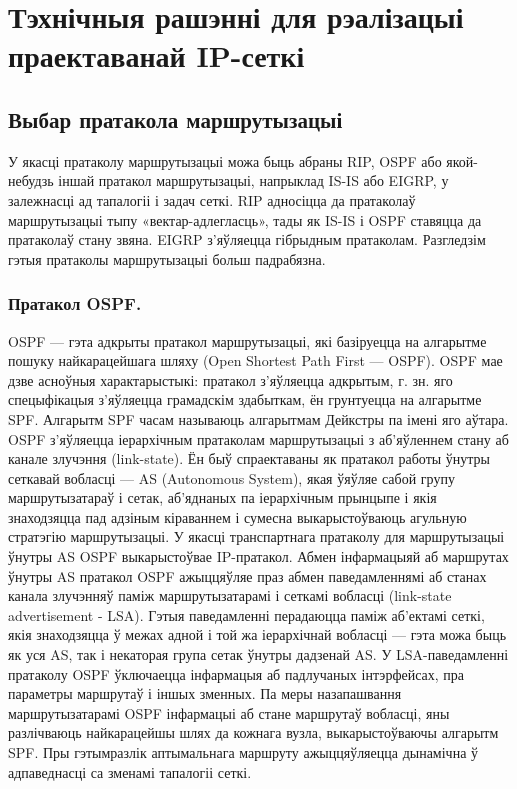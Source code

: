 \section{Тэхнічныя рашэнні для рэалізацыі праектаванай IP-сеткі}

\subsection{Выбар пратакола маршрутызацыі}

У якасці пратаколу маршрутызацыі можа быць абраны RIP, OSPF або якой-небудзь іншай пратакол маршрутызацыі, напрыклад IS-IS або EIGRP, у залежнасці ад тапалогіі і задач сеткі. RIP адносіцца да пратаколаў маршрутызацыі тыпу «вектар-адлегласць», тады як IS-IS і OSPF ставяцца да пратаколаў стану звяна. EIGRP з'яўляецца гібрыдным пратаколам. Разгледзім гэтыя пратаколы маршрутызацыі больш падрабязна.

\subsubsection{Пратакол OSPF.}
OSPF --- гэта адкрыты пратакол маршрутызацыі, які базіруецца на алгарытме пошуку найкарацейшага шляху (Open Shortest Path First --- OSPF). OSPF мае дзве асноўныя характарыстыкі: пратакол з'яўляецца адкрытым, г. зн. яго спецыфікацыя з'яўляецца грамадскім здабыткам, ён грунтуецца на алгарытме SPF. Алгарытм SPF часам называюць алгарытмам Дейкстры па імені яго аўтара. OSPF з'яўляецца іерархічным пратаколам маршрутызацыі з аб'яўленнем стану аб канале злучэння (link-state). Ён быў спраектаваны як пратакол работы ўнутры сеткавай вобласці --- AS (Autonomous System), якая ўяўляе сабой групу маршрутызатараў і сетак, аб'яднаных па іерархічным прынцыпе і якія знаходзяцца пад адзіным кіраваннем і сумесна выкарыстоўваюць агульную стратэгію маршрутызацыі. У якасці транспартнага пратаколу для маршрутызацыі ўнутры AS OSPF выкарыстоўвае IP-пратакол. Абмен інфармацыяй аб маршрутах ўнутры AS пратакол OSPF ажыццяўляе праз абмен паведамленнямі аб станах канала злучэнняў паміж маршрутызатарамі і сеткамі вобласці (link-state advertisement - LSA). Гэтыя паведамленні перадаюцца паміж аб'ектамі сеткі, якія знаходзяцца ў межах адной і той жа іерархічнай вобласці --- гэта можа быць як уся AS, так і некаторая група сетак ўнутры дадзенай AS. У LSA-паведамленні пратаколу OSPF ўключаецца інфармацыя аб падлучаных інтэрфейсах, пра параметры маршрутаў і іншых зменных. Па меры назапашвання маршрутызатарамі OSPF інфармацыі аб стане маршрутаў вобласці, яны разлічваюць найкарацейшы шлях да кожнага вузла, выкарыстоўваючы алгарытм SPF. Пры гэтымразлік аптымальнага маршруту ажыццяўляецца дынамічна ў адпаведнасці са зменамі тапалогіі сеткі.

